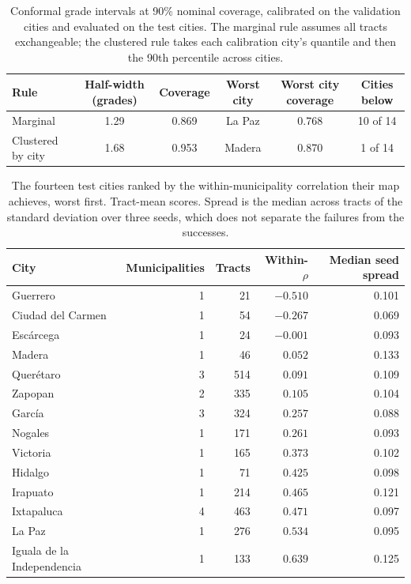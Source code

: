 \documentclass[11pt]{article}
\begin{document}
\begin{table}[h]
\centering
\caption{Conformal grade intervals at 90\% nominal coverage, calibrated on the validation
cities and evaluated on the test cities. The marginal rule assumes all tracts
exchangeable; the clustered rule takes each calibration city's quantile and then the 90th
percentile across cities.}
\begin{tabular}{lccccc}
\toprule
Rule & Half-width (grades) & Coverage & Worst city & Worst city coverage & Cities below\\
\midrule
Marginal & 1.29 & 0.869 & La Paz & 0.768 & 10 of 14\\
Clustered by city & 1.68 & 0.953 & Madera & 0.870 & 1 of 14\\
\bottomrule
\end{tabular}
\end{table}

\begin{table}[h]
\centering
\caption{The fourteen test cities ranked by the within-municipality correlation their map
achieves, worst first. Tract-mean scores. Spread is the median across tracts of the
standard deviation over three seeds, which does not separate the failures from the
successes.}
\begin{tabular}{lrrrr}
\toprule
City & Municipalities & Tracts & Within-$\rho$ & Median seed spread\\
\midrule
Guerrero & 1 & 21 & $-0.510$ & 0.101\\
Ciudad del Carmen & 1 & 54 & $-0.267$ & 0.069\\
Esc\'arcega & 1 & 24 & $-0.001$ & 0.093\\
Madera & 1 & 46 & $0.052$ & 0.133\\
Quer\'etaro & 3 & 514 & $0.091$ & 0.109\\
Zapopan & 2 & 335 & $0.105$ & 0.104\\
Garc\'ia & 3 & 324 & $0.257$ & 0.088\\
Nogales & 1 & 171 & $0.261$ & 0.093\\
Victoria & 1 & 165 & $0.373$ & 0.102\\
Hidalgo & 1 & 71 & $0.425$ & 0.098\\
Irapuato & 1 & 214 & $0.465$ & 0.121\\
Ixtapaluca & 4 & 463 & $0.471$ & 0.097\\
La Paz & 1 & 276 & $0.534$ & 0.095\\
Iguala de la Independencia & 1 & 133 & $0.639$ & 0.125\\
\bottomrule
\end{tabular}
\end{table}
\end{document}
